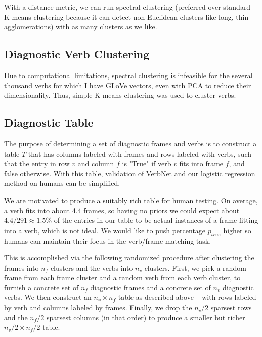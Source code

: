 \documentclass[a4paper]{article}
\begin{document}
With a distance metric, we can run spectral clustering (preferred over standard K-means clustering because it can detect non-Euclidean clusters like long, thin agglomerations) with as many clusters as we like.

\subsection{Diagnostic Verb Clustering}

Due to computational limitations, spectral clustering is infeasible for the several thousand verbs for which I have GLoVe vectors, even with PCA to reduce their dimensionality. Thus, simple K-means clustering was used to cluster verbs. 

\subsection{Diagnostic Table}

The purpose of determining a set of diagnostic frames and verbs is to construct a table $T$ that has columns labeled with frames and rows labeled with verbs, such that the entry in row $v$ and column $f$ is "True" if verb $v$ fits into frame $f$, and false otherwise. With this table, validation of VerbNet and our logistic regression method on humans can be simplified.

We are motivated to produce a suitably rich table for human testing. On average, a verb fits into about 4.4 frames, so having no priors we could expect about $4.4/291 \approx 1.5\%$ of the entries in our table to be actual instances of a frame fitting into a verb, which is not ideal. We would like to push percentage $p_{true}$  higher so humans can maintain their focus in the verb/frame matching task. 

This is accomplished via the following randomized procedure after clustering the frames into $n_f$ clusters and the verbs into $n_v$ clusters. First, we pick a random frame from each frame cluster and a random verb from each verb cluster, to furnish a concrete set of $n_f$ diagnostic frames and a concrete set of $n_v$ diagnostic verbs. We then construct an $n_v \times n_f$ table as described above -- with rows labeled by verb and columns labeled by frames. Finally, we drop the $n_v / 2$ sparsest rows and the $n_f/2$ sparsest columns (in that order) to produce a smaller but richer $n_v/2 \times n_f/2$ table.
\end{document}
